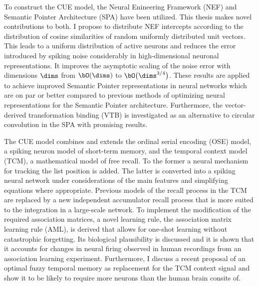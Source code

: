 To construct the CUE model, the Neural Enineering Framework (NEF) and Semantic Pointer Architecture (SPA) have been utilized.
This thesis makes novel contributions to both.
I propose to distribute NEF intercepts according to the distribution of cosine similarities of random uniformly distributed unit vectors.
This leads to a uniform distribution of active neurons and reduces the error introduced by spiking noise considerably in high-dimensional neuronal representations.
It improves the asymptotic scaling of the noise error with dimensions $\dims$ from $\bO(\dims)$ to $\bO\big(\dims^{3/4}\big)$.
These results are applied to achieve improved Semantic Pointer representations in neural networks which are on par or better compared to previous methods of optimizing neural representations for the Semantic Pointer architecture.
Furthermore, the vector-derived transformation binding (VTB) is investigated as an alternative to circular convolution in the SPA with promising results.

The CUE model combines and extends the ordinal serial encoding (OSE) model, a spiking neuron model of short-term memory, and the temporal context model (TCM), a mathematical model of free recall.
To the former a neural mechanism for tracking the list position is added.
The latter is converted into a spiking neural network under considerations of the main features and simplifying equations where appropriate.
Previous models of the recall process in the TCM are replaced by a new independent accumulator recall process that is more suited to the integration in a large-scale network.
To implement the modification of the required association matrices, a novel learning rule, the association matrix learning rule (AML), is derived that allows for one-shot learning without catastrophic forgetting.
Its biological plausibility is discussed and it is shown that it accounts for changes in neural firing observed in human recordings from an association learning experiment.
Furthermore, I discuss a recent proposal of an optimal fuzzy temporal memory as replacement for the TCM context signal and show it to be likely to require more neurons than the human brain consits of.


\cleardoublepage


